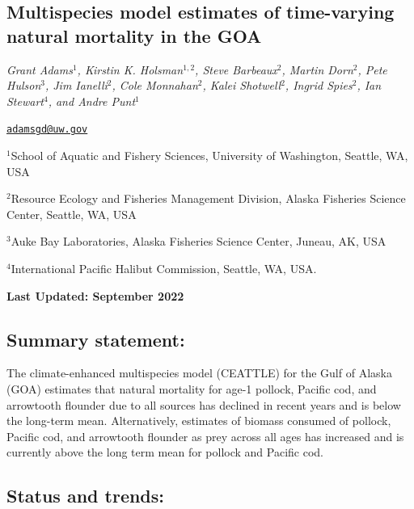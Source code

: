 \documentclass[
]{article}
\author{}
\date{\vspace{-2.5em}}
\begin{document}
\hypertarget{multispecies-model-estimates-of-time-varying-natural-mortality-in-the-goa}{%
\subsection{Multispecies model estimates of time-varying natural
mortality in the
GOA}\label{multispecies-model-estimates-of-time-varying-natural-mortality-in-the-goa}}

\emph{Grant Adams\(^1\), Kirstin K. Holsman\(^{1,2}\), Steve
Barbeaux\(^2\), Martin Dorn\(^2\), Pete Hulson\(^3\), Jim Ianelli\(^2\),
Cole Monnahan\(^2\), Kalei Shotwell\(^2\), Ingrid Spies\(^2\), Ian
Stewart\(^4\), and Andre Punt\(^1\)}

\href{mailto:adamsgd@uw.gov}{\nolinkurl{adamsgd@uw.gov}}

\(^1\)School of Aquatic and Fishery Sciences, University of Washington,
Seattle, WA, USA

\(^2\)Resource Ecology and Fisheries Management Division, Alaska
Fisheries Science Center, Seattle, WA, USA

\(^3\)Auke Bay Laboratories, Alaska Fisheries Science Center, Juneau,
AK, USA

\(^4\)International Pacific Halibut Commission, Seattle, WA, USA.

\textbf{Last Updated: September 2022}

\hypertarget{summary-statement}{%
\subsection{Summary statement:}\label{summary-statement}}

The climate-enhanced multispecies model (CEATTLE) for the Gulf of Alaska
(GOA) estimates that natural mortality for age-1 pollock, Pacific cod,
and arrowtooth flounder due to all sources has declined in recent years
and is below the long-term mean. Alternatively, estimates of biomass
consumed of pollock, Pacific cod, and arrowtooth flounder as prey across
all ages has increased and is currently above the long term mean for
pollock and Pacific cod.

\hypertarget{status-and-trends}{%
\subsection{Status and trends:}\label{status-and-trends}}
\end{document}
